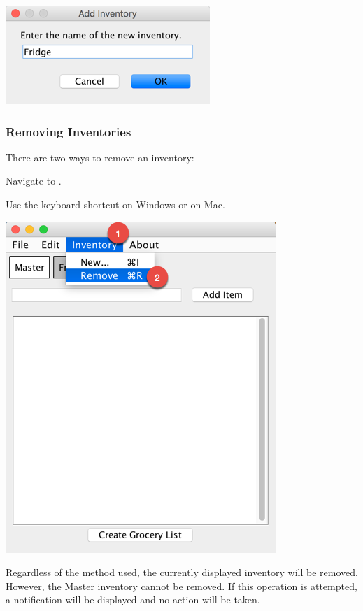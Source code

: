 \documentclass[letterpaper,12pt]{article}
\renewenvironment{enumerate}[1]{\begin{compactenum}#1}{\end{compactenum}}
\begin{document}
\centerline{\includegraphics[scale=0.65]{02.png}}

	\subsubsection{Removing Inventories}
	
	
	There are two ways to remove an inventory:

\begin{enumerate}
\item Navigate to .


\item Use the keyboard shortcut  on Windows or  on Mac. \\

\end{enumerate}	
	
\centerline{\includegraphics[scale=0.5]{12.png}}


Regardless of the method used, the currently displayed inventory will be removed. However, the Master inventory cannot be removed. If this operation is attempted, a notification will be displayed and no action will be taken.
\end{document}

